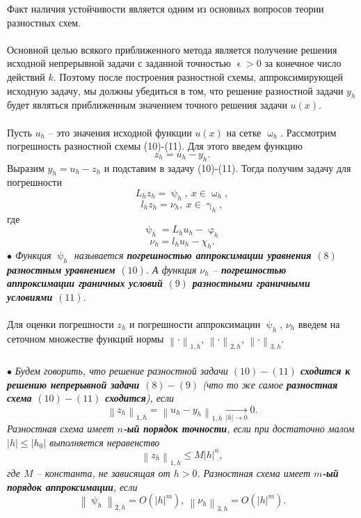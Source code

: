 \documentclass[a4paper, 12pt]{report}
\numberwithin{equation}{section}
\renewcommand{\leq}{\leqslant}
\renewcommand{\gamma}{\upgamma}
\renewcommand{\varphi}{\upvarphi}
\renewcommand{\psi}{\uppsi}
\renewcommand{\omega}{\upomega}
\renewcommand{\epsilon}{\upvarepsilon}
\newcommand\Norm[1]{\left\| #1 \right\|}
\begin{document}
Факт наличия устойчивости является одним из основных вопросов теории разностных схем.\\\\
Основной целью всякого приближенного метода является получение решения исходной непрерывной задачи с заданной точностью $\epsilon>0$ за конечное число действий $k$. Поэтому после построения разностной схемы, аппроксимирующей исходную задачу, мы должны убедиться в том, что решение разностной задачи $y_h$ будет являться приближенным значением точного решения задачи $u(x)$.\\\\
Пусть $u_h$  -- это значения исходной функции $u(x)$ на сетке $\omega_h$. Рассмотрим погрешность разностной схемы (10)-(11). Для этого введем функцию $$z_h = u_h - y_h.$$ Выразим $y_h = u_h - z_h$ и подставим в задачу (10)-(11). Тогда получим задачу для погрешности 
\begin{equation}
L_h z_h = \psi_h,\ x \in \omega_h,
\end{equation}
\begin{equation}
	l_h z_h = \nu_h,\ x \in \gamma_h,
\end{equation}
где
$$\psi_h = L_h u_h - \varphi_h$$
$$\nu_h = l_hu_h - \chi_h.$$
\textit{$\bullet$ Функция $\psi_h$ называется \textbf{погрешностью аппроксимации уравнения $(8)$ разностным уравнением $(10)$}. А функция $\nu_h$ -- \textbf{погрешностью аппроксимации граничных условий $(9)$ разностными граничными условиями $(11)$}.}\\\\
Для оценки погрешности $z_h$ и погрешности аппроксимации $\psi_h$, $\nu_h$ введем на сеточном множестве функций нормы $\Norm{\cdot}_{1,h}$, $\Norm{\cdot}_{2,h}$, $\Norm{\cdot}_{3,h}$.\\\\
$\bullet$ \textit{Будем говорить, что решение разностной задачи $(10)-(11)$ \textbf{сходится к решению непрерывной задачи $(8)-(9)$} (что то же самое \textbf{разностная схема $(10)-(11)$ сходится}), если }
\begin{equation}
	\Norm{z_h}_{1,h}= \Norm{u_h - y_h}_{1,h} \xrightarrow[|h| \to 0]{}0.
\end{equation}
\textit{Разностная схема имеет \textbf{$n$-ый порядок точности}, если при достаточно малом $|h|\leq |h_0|$ выполняется неравенство}
\begin{equation}
	\Norm{z_h}_{1,h}\leq M|h|^n,
\end{equation}
\textit{где $M$ -- константа, не зависящая от $h>0$.}
\textit{Разностная схема имеет \textbf{$m$-ый порядок аппроксимации}, если} \begin{equation}
	\Norm{\psi_h}_{2,h} = O(|h|^m),\ \Norm{\nu_h}_{3,h} = O(|h|^m).
\end{equation}
\end{document}
